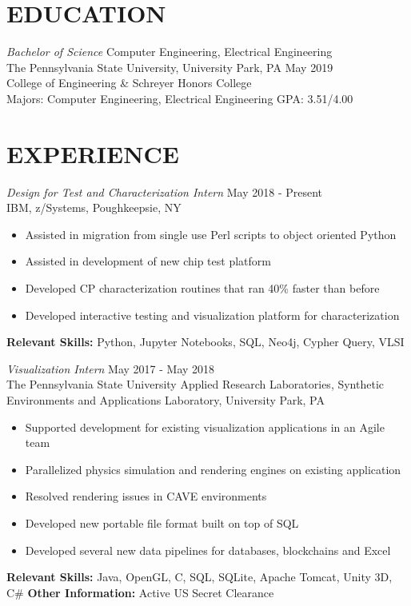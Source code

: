 \documentclass[line,margin]{res}
\begin{document}
	\address{235 S. Buckhout St. State College, PA 16801}
	\address{(484) 904-2099}
	
	\begin{resume}
		
		
		\section{EDUCATION}{\sl Bachelor of Science} Computer Engineering, Electrical Engineering \\
		The Pennsylvania State University, University Park, PA \hfill May 2019\\
		College of Engineering \& Schreyer Honors College\\
		Majors: Computer Engineering, Electrical Engineering \hfill GPA: 3.51/4.00
		
		\section{EXPERIENCE}{\sl Design for Test and Characterization Intern} \hfill May 2018 - Present\\
		IBM, z/Systems, Poughkeepsie, NY
		\begin{itemize}  \itemsep -2pt
			\item Assisted in migration from single use Perl scripts to object oriented Python
			\item Assisted in development of new chip test platform
			\item Developed CP characterization routines that ran 40\% faster than before
			\item Developed interactive testing and visualization platform for characterization
			\vspace*{-\baselineskip}		
		\end{itemize}
		\textbf{Relevant Skills:} Python, Jupyter Notebooks, SQL, Neo4j, Cypher Query, VLSI
		\newline
		
		{\sl Visualization Intern} \hfill May 2017 - May 2018 \\
		The Pennsylvania State University Applied Research Laboratories, Synthetic Environments and Applications Laboratory, University Park, PA
		\begin{itemize}  \itemsep -2pt
			\item Supported development for existing visualization applications in an Agile team
			\item Parallelized physics simulation and rendering engines on existing application
			\item Resolved rendering issues in CAVE environments
			\item Developed new portable file format built on top of SQL
			\item Developed several new data pipelines for databases, blockchains and Excel
			\vspace*{-\baselineskip}		
		\end{itemize}
		\textbf{Relevant Skills:} Java, OpenGL, C, SQL, SQLite, Apache Tomcat, Unity 3D, C\#
		\textbf{Other Information:} Active US Secret Clearance
		\newline
		

\end{resume}
\end{document}
